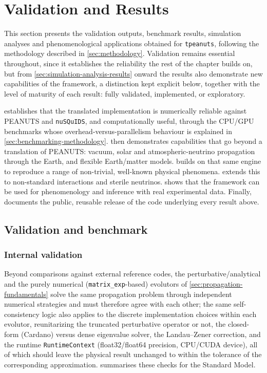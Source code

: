 \section{Validation and Results}

This section presents the validation outputs, benchmark results, simulation analyses and phenomenological applications obtained for \texttt{tpeanuts}, following the methodology described in \cref{sec:methodology}. Validation remains essential throughout, since it establishes the reliability the rest of the chapter builds on, but from \cref{sec:simulation-analysis-results} onward the results also demonstrate new capabilities of the framework, a distinction kept explicit below, together with the level of maturity of each result: fully validated, implemented, or exploratory.

  establishes that the translated implementation is numerically reliable against PEANUTS and \texttt{nuSQuIDS}, and computationally useful, through the CPU/GPU benchmarks whose overhead-versus-parallelism behaviour is explained in \cref{sec:benchmarking-methodology}.  then demonstrates capabilities that go beyond a translation of PEANUTS: vacuum, solar and atmospheric-neutrino propagation through the Earth, and flexible Earth/matter models.  builds on that same engine to reproduce a range of non-trivial, well-known physical phenomena.  extends this to non-standard interactions and sterile neutrinos.  shows that the framework can be used for phenomenology and inference with real experimental data. Finally,   documents the public, reusable release of the code underlying every result above.

\subsection{Validation and benchmark}
\label{sec:validation-benchmark-results}

\subsubsection{Internal validation}
\label{sec:internal-validation}

Beyond comparisons against external reference codes, the perturbative/analytical and the purely numerical (\texttt{matrix\_exp}-based) evolutors of \cref{sec:propagation-fundamentals} solve the same propagation problem through independent numerical strategies and must therefore agree with each other; the same self-consistency logic also applies to the discrete implementation choices within each evolutor, reunitarizing the truncated perturbative operator or not, the closed-form (Cardano) versus dense eigenvalue solver, the Landau--Zener correction, and the runtime \texttt{RuntimeContext} (float32/float64 precision, CPU/CUDA device), all of which should leave the physical result unchanged to within the tolerance of the corresponding approximation.  summarises these checks for the Standard Model.

